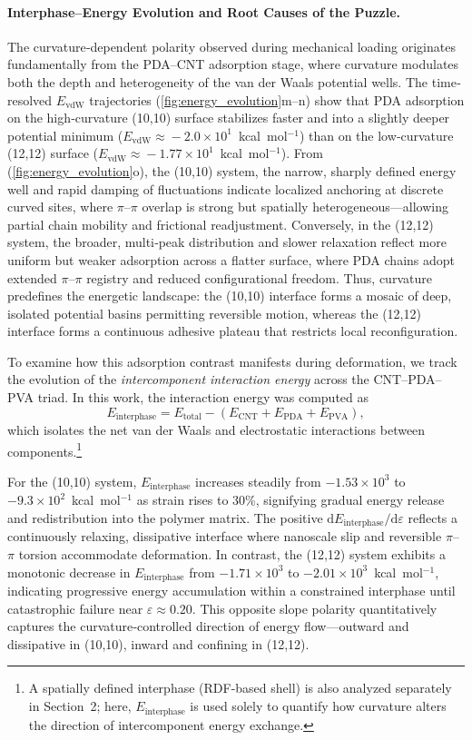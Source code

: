 \documentclass[journal=jacsat,manuscript=article]{achemso}
\begin{document}
{\paragraph{Interphase–Energy Evolution and Root Causes of the Puzzle.}
The curvature‐dependent polarity observed during mechanical loading originates fundamentally from the PDA–CNT adsorption stage, where curvature modulates both the depth and heterogeneity of the van der Waals potential wells. The time‐resolved $E_\mathrm{vdW}$ trajectories (\autoref{fig:energy_evolution}m–n) show that PDA adsorption on the high‐curvature (10,10) surface stabilizes faster and into a slightly deeper potential minimum ($E_\mathrm{vdW}\!\approx\!-2.0\times10^{1}$~kcal~mol$^{-1}$) than on the low‐curvature (12,12) surface ($E_\mathrm{vdW}\!\approx\!-1.77\times10^{1}$~kcal~mol$^{-1}$). From (\autoref{fig:energy_evolution}o), the (10,10) system, the narrow, sharply defined energy well and rapid damping of fluctuations indicate localized anchoring at discrete curved sites, where $\pi$–$\pi$ overlap is strong but spatially heterogeneous—allowing partial chain mobility and frictional readjustment. Conversely, in the (12,12) system, the broader, multi‐peak distribution and slower relaxation reflect more uniform but weaker adsorption across a flatter surface, where PDA chains adopt extended $\pi$–$\pi$ registry and reduced configurational freedom. Thus, curvature predefines the energetic landscape: the (10,10) interface forms a mosaic of deep, isolated potential basins permitting reversible motion, whereas the (12,12) interface forms a continuous adhesive plateau that restricts local reconfiguration.

To examine how this adsorption contrast manifests during deformation, we track the evolution of the \emph{intercomponent interaction energy} across the CNT–PDA–PVA triad. In this work, the interaction energy was computed as
\[
E_\mathrm{interphase} = E_\mathrm{total} - (E_\mathrm{CNT} + E_\mathrm{PDA} + E_\mathrm{PVA}),
\]
which isolates the net van der Waals and electrostatic interactions between components.\footnote{A spatially defined interphase  (RDF-based shell) is also analyzed separately in Section~2; here, $E_\mathrm{interphase}$ is used solely to quantify how curvature alters the direction of intercomponent energy exchange.}



 For the (10,10) system, $E_\mathrm{interphase}$ increases steadily from $-1.53\times10^{3}$ to $-9.3\times10^{2}$~kcal~mol$^{-1}$ as strain rises to 30\%, signifying gradual energy release and redistribution into the polymer matrix. The positive $\mathrm{d}E_\mathrm{interphase}/\mathrm{d}\varepsilon$ reflects a continuously relaxing, dissipative interface where nanoscale slip and reversible $\pi$–$\pi$ torsion accommodate deformation. In contrast, the (12,12) system exhibits a monotonic decrease in $E_\mathrm{interphase}$ from $-1.71\times10^{3}$ to $-2.01\times10^{3}$~kcal~mol$^{-1}$, indicating progressive energy accumulation within a constrained interphase until catastrophic failure near $\varepsilon\!\approx\!0.20$. This opposite slope polarity quantitatively captures the curvature‐controlled direction of energy flow—outward and dissipative in (10,10), inward and confining in (12,12).

}
\end{document}
